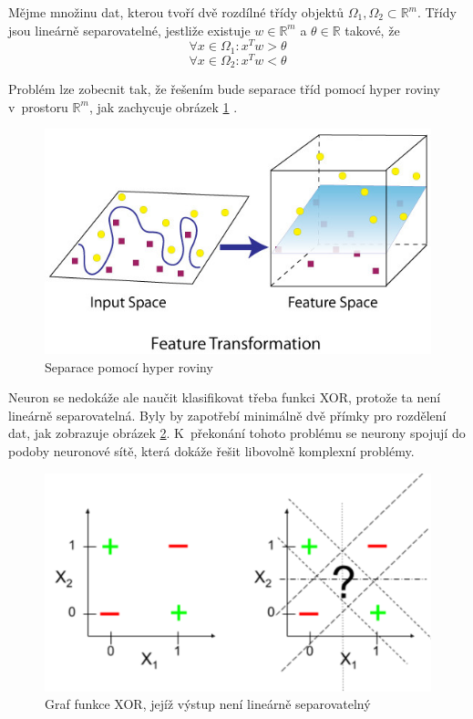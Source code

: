 Mějme množinu dat, kterou tvoří dvě rozdílné třídy objektů $\Omega_1, \Omega_2 \subset \mathbb{R}^m$. Třídy jsou lineárně separovatelné, jestliže existuje $w \in 
\mathbb{R}^m$ a $\theta \in \mathbb{R}$ takové, že 
\begin{equation}
   \forall x \in \Omega_1 : x^Tw > \theta
\end{equation}
\begin{equation}
   \forall x \in \Omega_2 : x^Tw < \theta
\end{equation}

Problém lze zobecnit tak, že řešením bude separace tříd pomocí hyper roviny v~prostoru $\mathbb{R}^m$, jak zachycuje obrázek \ref{fig:hyperplane_separable}
\cite{linearseparability}.

\begin{figure}[H]
    \centering
    \includegraphics[scale=0.8]{obrazky-figures/hyperplane_separable.jpeg}
    \caption{\label{fig:hyperplane_separable}Separace pomocí hyper roviny} 
\end{figure}

Neuron se nedokáže ale naučit klasifikovat třeba funkci XOR, protože ta není lineárně separovatelná. Byly by zapotřebí minimálně dvě přímky pro rozdělení dat, jak zobrazuje obrázek \ref{fig:xor}. K~překonání tohoto problému se neurony spojují do podoby neuronové sítě, která dokáže řešit libovolně komplexní problémy.

\begin{figure}[H]
    \centering
    \includegraphics[scale=0.3]{obrazky-figures/xor.png}
    \caption{\label{fig:xor}Graf funkce XOR, jejíž výstup není lineárně separovatelný} 
\end{figure}








